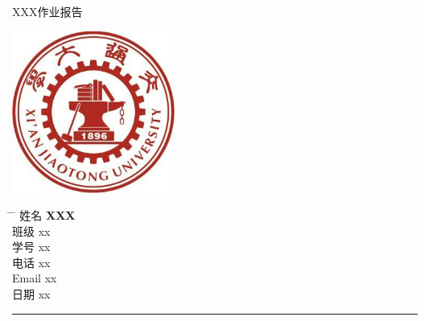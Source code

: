 \documentclass{ctexart}
\begin{document}
\begin{titlepage}
    \begin{center}
        \Huge{XXX作业报告}
        \noindent{\color{BrickRed} \rule{\linewidth}{1mm}}
        \Huge
        \vspace{0.5cm}
		\LARGE
		\vspace{1.5cm}
		\textbf{}

        \includegraphics[width=0.4\textwidth]{school_emblem.png}

        \vspace{1.5cm}
    \end{center}
    \Large
    \begin{tabbing}
        \hspace*{1em}\= \hspace*{8em} \= \kill %
        \> 姓名 \>  \textbf{XXX} \\
        \> 班级 \>  xx \\
        \> 学号 \>  xx  \\
        \> 电话  \> xx \\
        \> Email \> xx \\
        \> 日期 \>  xx
    \end{tabbing}
    
\end{titlepage}
\newpage{}

\smallskip{}
\hrule{}
\bigskip{}
\end{document}
